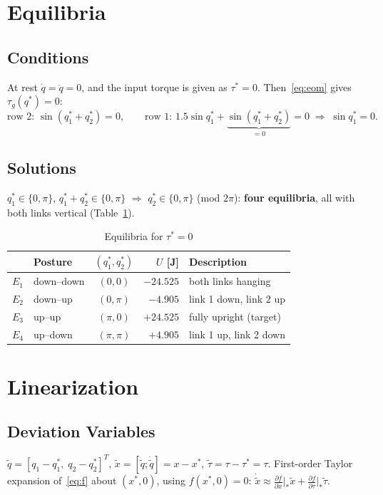 \documentclass[10pt,letterpaper]{article}
\begin{document}
\section{Equilibria}
\subsection{Conditions}
At rest $\dot q=\ddot q=0$, and the input torque is given as $\tau^*=0$. Then~\eqref{eq:eom} gives $\tau_g(q^*)=0$:
\begin{equation*}
\text{row 2: }\sin(q_1^*+q_2^*)=0,\qquad
\text{row 1: }1.5\sin q_1^*+\underbrace{\sin(q_1^*+q_2^*)}_{=0}=0\;\Rightarrow\;\sin q_1^*=0 .
\end{equation*}
\subsection{Solutions}
$q_1^*\in\{0,\pi\}$, $q_1^*+q_2^*\in\{0,\pi\}$ $\Rightarrow$ $q_2^*\in\{0,\pi\}$ (mod $2\pi$): \textbf{four equilibria}, all with both links vertical (Table~\ref{tab:eq}).

\begin{table}[h]
\centering
\caption{Equilibria for $\tau^*=0$}\label{tab:eq}
\footnotesize\setlength{\tabcolsep}{6pt}\renewcommand{\arraystretch}{0.9}
\begin{tabular}{@{}clcrl@{}}
\toprule
 & Posture & $(q_1^*,q_2^*)$ & $U$ [J] & Description\\
\midrule
$E_1$ & down--down & $(0,0)$ & $-24.525$ & both links hanging\\
$E_2$ & down--up & $(0,\pi)$ & $-4.905$ & link 1 down, link 2 up\\
$E_3$ & up--up & $(\pi,0)$ & $+24.525$ & fully upright (target)\\
$E_4$ & up--down & $(\pi,\pi)$ & $+4.905$ & link 1 up, link 2 down\\
\bottomrule
\end{tabular}
\end{table}

\section{Linearization}
\subsection{Deviation Variables}
$\tilde q=[q_1-q_1^*,\;q_2-q_2^*]^T$, $\tilde x=[\tilde q;\dot{\tilde q}]=x-x^*$, $\tilde\tau=\tau-\tau^*=\tau$. First-order Taylor expansion of~\eqref{eq:f} about $(x^*,0)$, using $f(x^*,0)=0$: $\dot{\tilde x}\approx\frac{\partial f}{\partial x}\big|_*\tilde x+\frac{\partial f}{\partial\tau}\big|_*\tilde\tau$.
\end{document}
